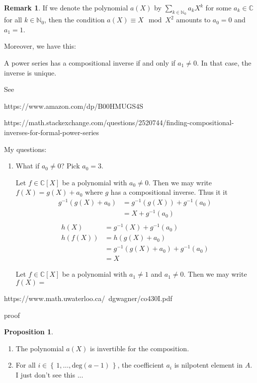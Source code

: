 \documentclass[a4paper]{article}
\theoremstyle{definition}
\newtheorem{proposition}[definition]{Proposition}
\newtheorem*{remark}{Remark}
\newcommand{\set}[1]{\left\{\, #1 \,\right\}}
\begin{document}
\begin{remark}
    If we denote the polynomial \(a(X)\) by \(\sum_{k \in \mathbb{N}_0}a_k X^k\) for some \(a_k \in \mathbb{C}\) for all \(k \in \mathbb{N}_0\), then the condition \(a(X) \equiv X \mod{X^2}\) amounts to \(a_0 = 0\) and \(a_1 = 1\).

    Moreover, we have this:

    A power series has a compositional inverse if and only if \(a_1 \neq 0\). In that case, the inverse is unique.

    See

    https://www.amazon.com/dp/B00HMUGS4S

    https://math.stackexchange.com/questions/2520744/finding-compositional-inverses-for-formal-power-series

    My questions:

    \begin{enumerate}
        \item What if \(a_0 \neq 0\)? Pick \(a_0 = 3\).
        
        Let \(f \in \mathbb{C}[X]\) be a polynomial with \(a_0 \neq 0\). Then we may write \(f(X) = g(X) + a_0\) where \(g\) has a compositional inverse. Thus it it
        \begin{align*}
            g^{-1}(g(X) + a_0) &= g^{-1}(g(X)) + g^{-1}(a_0) \\
            &= X + g^{-1}(a_0) \\
        \end{align*}
        \begin{align*}
            h(X) &= g^{-1}(X) + g^{-1}(a_0) \\
            h(f(X)) &= h(g(X) + a_0) \\
            &= g^{-1}(g(X) + a_0) + g^{-1}(a_0) \\
            &= X
        \end{align*}

        Let \(f \in \mathbb{C}[X]\) be a polynomial with \(a_1 \neq 1\) and \(a_1 \neq 0\). Then we may write \(f(X) =\)
    \end{enumerate}
\end{remark}

https://www.math.uwaterloo.ca/~dgwagner/co430I.pdf

proof



\begin{proposition}
    \begin{enumerate}
        \item The polynomial \(a(X)\) is invertible for the composition.
        \item For all \(i \in \set{1, \ldots, \text{deg}(a - 1)}\), the coefficient \(a_i\) is nilpotent element in \(A\).
        I just don't see this ...
    \end{enumerate}
\end{proposition}
\end{document}
